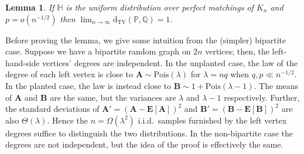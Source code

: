 \documentclass[11pt]{article}
\newcommand{\e}{{\mathbf E}}
\newcommand{\dtv}{\mathrm{d}_{\mathrm{TV}}}
\newcommand{\bA}{\mathbf{A}}
\newcommand{\bB}{\mathbf{B}}
\newcommand{\bbH}{\mathbb{H}}
\newcommand{\bbP}{\mathbb{P}}
\newcommand{\bbQ}{\mathbb{Q}}
\newtheorem{lem}[thm]{Lemma}
\numberwithin{equation}{section}
\numberwithin{thm}{section}
\newcommand{\Pois}{\mathrm{Pois}}
\begin{document}
\begin{lem}\label{lem:test-match}
If $\bbH$ is the uniform distribution over perfect matchings of $K_n$ and $p = o(n^{-1/2})$ then $\lim_{n \to \infty} \dtv(\bbP,\bbQ) = 1$.
\end{lem}
Before proving the lemma, we give some intuition from the (simpler) bipartite case.
Suppose we have a bipartite random graph on $2n$ vertices; then, the left-hand-side vertices' degrees are independent.
In the unplanted case, the law of the degree of each left vertex is close to $\bA \sim \Pois(\lambda)$ for $\lambda = nq$ when $q,p \ll n^{-1/2}$.
In the planted case, the law is instead close to $\bB \sim 1+\Pois(\lambda - 1)$.
The means of $\bA$ and $\bB$ are the same, but the variances are $\lambda$ and $\lambda-1$ respectively.
Further, the standard deviations of $\bA' = (\bA - \e[\bA])^2$ and $\bB' = (\bB - \e[\bB])^2$ are also $\Theta(\lambda)$.
Hence the $n = \Omega(\lambda^{2})$ i.i.d.\ samples furnished by the left vertex degrees suffice to distinguish the two distributions. 
In the non-bipartite case the degrees are not independent, but the idea of the proof is effectively the same.
\end{document}
